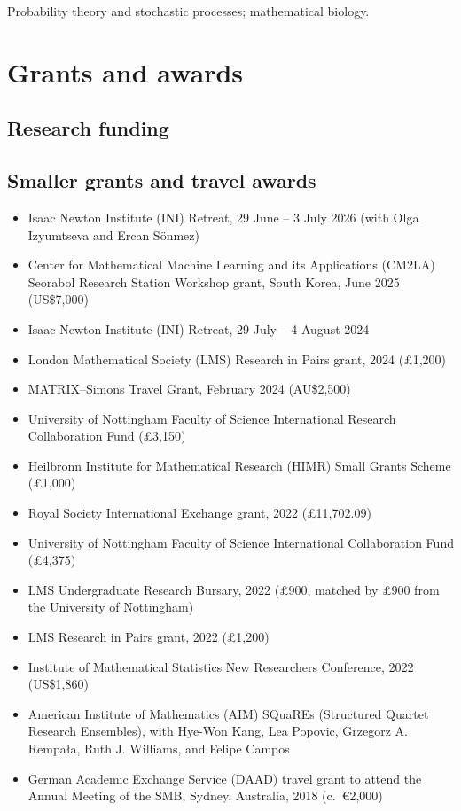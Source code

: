 \documentclass[11pt,a4paper]{article}
\begin{document}
Probability theory and stochastic processes; mathematical biology.

\section{Grants and awards}

\subsection{Research funding}

\subsection{Smaller grants and travel awards}
\begin{itemize}
  \item Isaac Newton Institute (INI) Retreat, 29 June -- 3 July 2026 (with Olga Izyumtseva and Ercan Sönmez)
  \item Center for Mathematical Machine Learning and its Applications (CM2LA) Seorabol Research Station Workshop grant, South Korea, June 2025 (US\$7,000)
  \item Isaac Newton Institute (INI) Retreat, 29 July -- 4 August 2024
  \item London Mathematical Society (LMS) Research in Pairs grant, 2024 (£1,200)
  \item MATRIX--Simons Travel Grant, February 2024 (AU\$2,500)
  \item University of Nottingham Faculty of Science International Research Collaboration Fund (£3,150)
  \item Heilbronn Institute for Mathematical Research (HIMR) Small Grants Scheme (£1,000)
  \item Royal Society International Exchange grant, 2022 (£11,702.09)
  \item University of Nottingham Faculty of Science International Collaboration Fund (£4,375)
  \item LMS Undergraduate Research Bursary, 2022 (£900, matched by £900 from the University of Nottingham)
  \item LMS Research in Pairs grant, 2022 (£1,200)
  \item Institute of Mathematical Statistics New Researchers Conference, 2022 (US\$1,860)
  \item American Institute of Mathematics (AIM) SQuaREs (Structured Quartet Research Ensembles), with Hye-Won Kang, Lea Popovic, Grzegorz A. Rempała, Ruth J. Williams, and Felipe Campos
  \item German Academic Exchange Service (DAAD) travel grant to attend the Annual Meeting of the SMB, Sydney, Australia, 2018 (c.\ €2,000)
\end{itemize}
\end{document}
